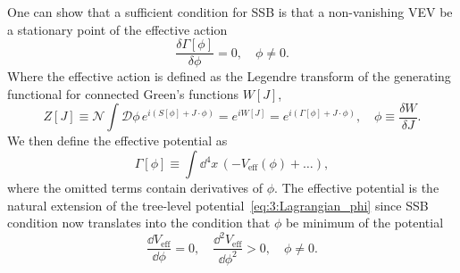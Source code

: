 One can show that a sufficient condition for \acs{SSB} is that a non-vanishing \acs{VEV} be a stationary point of the effective action
\begin{equation}
\frac{\delta \Gamma [\phi]}{\delta \phi} = 0, \quad \phi \neq 0.
\label{eq:3:SSB_condition}
\end{equation}
Where the effective action is defined as the Legendre transform of the generating functional for connected Green's functions $W[J]$, \ie
\begin{equation}
Z[J] \equiv \mathcal{N} \int \mathcal{D} \phi \, e^{i (S[\phi] + J \cdot \phi)} = e^{i W[J]} = e^{i (\Gamma[\phi] + J \cdot \phi)}, \quad \phi \equiv \frac{\delta W}{\delta J}.
\end{equation}
We then define the effective potential as
\begin{equation}
\Gamma [\phi] \equiv \int \dd^4 x\, \left(-V_{\text{eff}}(\phi) + \ldots \right),
\label{eq:3:Veff}
\end{equation}
where the omitted terms contain derivatives of $\phi$. The effective potential is the natural extension of the tree-level potential~\eqref{eq:3:Lagrangian_phi} since \acs{SSB} condition now translates into the condition that $\phi$ be minimum of the potential
\begin{equation}
\frac{\dd V_\text{eff}}{\dd \phi} = 0, \quad \frac{\dd^2 V_\text{eff}}{\dd \phi^2} > 0, \quad \phi \neq 0.
\end{equation}

